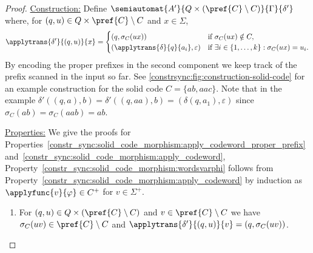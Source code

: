 \begin{proof}
	\medskip
	\noindent\underline{Construction:} Define $\semiautomat{A'}{Q \times (\pref{C} \setminus C)}{\Gamma}{\delta'}$
	where, for $(q, u) \in Q \times \pref{C} \setminus C$
	and $x \in \Sigma$,
	\begin{equation}\label{constr_sync:eqn:aut_solid_code}
		\applytrans{\delta'}{(q,u)}{x} = \begin{cases}
			(q, \sigma_C(ux)) & \text{if } \sigma_C(ux) \notin C, \\
			(\applytrans{\delta}{q}{a_i}, \varepsilon) & \text{if } \exists i \in \{1,\ldots,k\} : \sigma_C(ux) = u_i. 
		\end{cases}
	\end{equation}
	By encoding the proper prefixes in the second component
	we keep track of the prefix scanned in the input so far.	
	See \cref{constrsync:fig:construction-solid-code} for an example construction
	for the solid code $C = \{ab,aac\}$.
	Note that in the example $\delta'((q, a), b) = \delta'((q,aa), b) = (\delta(q, a_1), \varepsilon)$
	since $\sigma_C(ab) = \sigma_C(aab) = ab$.
		
	
	\noindent\underline{Properties:} We give the proofs for Properties~\ref{constr_sync:solid_code_morphism:apply_codeword_proper_prefix} and~\ref{constr_sync:solid_code_morphism:apply_codeword},
	Property~\ref{constr_sync:solid_code_morphism:wordsvarphi} follows from Property~\ref{constr_sync:solid_code_morphism:apply_codeword} by induction
	as $\applyfunc{v}{\varphi} \in C^+$ for $v \in \Sigma^+$.
	\begin{enumerate}
		\item \label{constr_sync:solid_code_morphism:apply_codeword_proper_prefix}
		For $(q, u) \in Q \times ( \pref{C} \setminus C )$ and $v \in \pref{C} \setminus C$
		we have $\sigma_C(uv) \in \pref{C} \setminus C$ and $\applytrans{\delta'}{(q,u)}{v}  = (q, \sigma_C(uv))$.		
		

\end{enumerate}
\end{proof}
